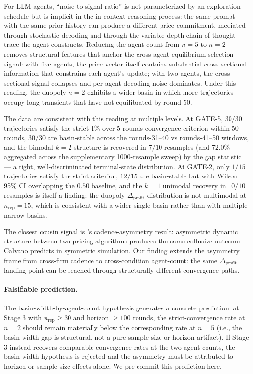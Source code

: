 For LLM agents, ``noise-to-signal ratio'' is not parameterized by an exploration schedule but is implicit in the in-context reasoning process: the same prompt with the same prior history can produce a different price commitment, mediated through stochastic decoding and through the variable-depth chain-of-thought trace the agent constructs. Reducing the agent count from $n = 5$ to $n = 2$ removes structural features that anchor the cross-agent equilibrium-selection signal: with five agents, the price vector itself contains substantial cross-sectional information that constrains each agent's update; with two agents, the cross-sectional signal collapses and per-agent decoding noise dominates. Under this reading, the duopoly $n = 2$ exhibits a wider basin in which more trajectories occupy long transients that have not equilibrated by round 50.

The data are consistent with this reading at multiple levels. At GATE-5, $30/30$ trajectories satisfy the strict 1\%-over-5-rounds convergence criterion within 50 rounds, $30/30$ are basin-stable across the rounds-31--40 vs rounds-41--50 windows, and the bimodal $k = 2$ structure is recovered in $7/10$ resamples (and $72.0\%$ aggregated across the supplementary 1000-resample sweep) by the gap statistic --- a tight, well-discriminated terminal-state distribution. At GATE-2, only $1/15$ trajectories satisfy the strict criterion, $12/15$ are basin-stable but with Wilson 95\% CI overlapping the $0.50$ baseline, and the $k = 1$ unimodal recovery in $10/10$ resamples is itself a finding: the duopoly $\Delta_{\text{profit}}$ distribution is not multimodal at $n_{\text{rep}} = 15$, which is consistent with a wider single basin rather than with multiple narrow basins.

The closest cousin signal is \citet{BrownMackay_2024_nber_pricing_cadence}'s cadence-asymmetry result: asymmetric dynamic structure between two pricing algorithms produces the same collusive outcome Calvano predicts in symmetric simulation. Our finding extends the asymmetry frame from cross-firm cadence to cross-condition agent-count: the same $\Delta_{\text{profit}}$ landing point can be reached through structurally different convergence paths.

\paragraph{Falsifiable prediction.}
The basin-width-by-agent-count hypothesis generates a concrete prediction: at Stage 3 with $n_{\text{rep}} \geq 30$ and horizon $\geq 100$ rounds, the strict-convergence rate at $n = 2$ should remain materially below the corresponding rate at $n = 5$ (i.e., the basin-width gap is structural, not a pure sample-size or horizon artifact). If Stage 3 instead recovers comparable convergence rates at the two agent counts, the basin-width hypothesis is rejected and the asymmetry must be attributed to horizon or sample-size effects alone. We pre-commit this prediction here.

